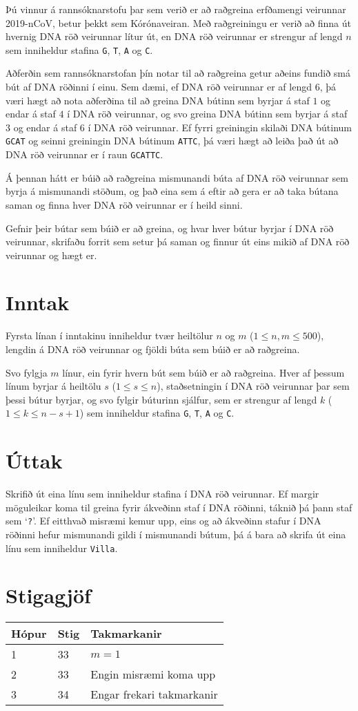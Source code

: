 %
Þú vinnur á rannsóknarstofu þar sem verið er að raðgreina erfðamengi veirunnar
2019-nCoV, betur þekkt sem Kórónaveiran. Með raðgreiningu er verið að finna út
hvernig DNA röð veirunnar lítur út, en DNA röð veirunnar er strengur af lengd
$n$ sem inniheldur stafina \texttt{G}, \texttt{T}, \texttt{A} og \texttt{C}.

Aðferðin sem rannsóknarstofan þín notar til að raðgreina getur aðeins fundið
smá bút af DNA röðinni í einu. Sem dæmi, ef DNA röð veirunnar er af lengd $6$,
þá væri hægt að nota aðferðina til að greina DNA bútinn sem byrjar á staf $1$
og endar á staf $4$ í DNA röð veirunnar, og svo greina DNA bútinn sem byrjar á
staf $3$ og endar á staf $6$ í DNA röð veirunnar. Ef fyrri greiningin skilaði
DNA bútinum \texttt{GCAT} og seinni greiningin DNA bútinum \texttt{ATTC}, þá
væri hægt að leiða það út að DNA röð veirunnar er í raun \texttt{GCATTC}.

Á þennan hátt er búið að raðgreina mismunandi búta af DNA röð veirunnar sem
byrja á mismunandi stöðum, og það eina sem á eftir að gera er að taka bútana
saman og finna hver DNA röð veirunnar er í heild sinni.

Gefnir þeir bútar sem búið er að greina, og hvar hver bútur byrjar í DNA röð
veirunnar, skrifaðu forrit sem setur þá saman og finnur út eins mikið af DNA
röð veirunnar og hægt er.

\section*{Inntak}
Fyrsta línan í inntakinu inniheldur tvær heiltölur $n$ og $m$ ($1 \leq n, m \leq
500$), lengdin á DNA röð veirunnar og fjöldi búta sem búið er að raðgreina.

Svo fylgja $m$ línur, ein fyrir hvern bút sem búið er að raðgreina. Hver af
þessum línum byrjar á heiltölu $s$ ($1 \leq s \leq n$), staðsetningin í DNA röð
veirunnar þar sem þessi bútur byrjar, og svo fylgir búturinn sjálfur, sem er
strengur af lengd $k$ ($1\leq k \leq n-s+1$) sem inniheldur stafina \texttt{G},
\texttt{T}, \texttt{A} og \texttt{C}.

\section*{Úttak}
Skrifið út eina línu sem inniheldur stafina í DNA röð veirunnar. Ef margir
möguleikar koma til greina fyrir ákveðinn staf í DNA röðinni, táknið þá þann
staf sem `\texttt{?}'. Ef eitthvað misræmi kemur upp, eins og að ákveðinn
stafur í DNA röðinni hefur mismunandi gildi í mismunandi bútum, þá á bara að
skrifa út eina línu sem inniheldur \texttt{Villa}.

\section*{Stigagjöf}
\begin{tabular}{|l|l|l|}
\hline
Hópur & Stig & Takmarkanir \\ \hline
1     & 33   & $m=1$ \\ \hline
2     & 33   & Engin misræmi koma upp \\ \hline
3     & 34   & Engar frekari takmarkanir\\ \hline
\end{tabular}

